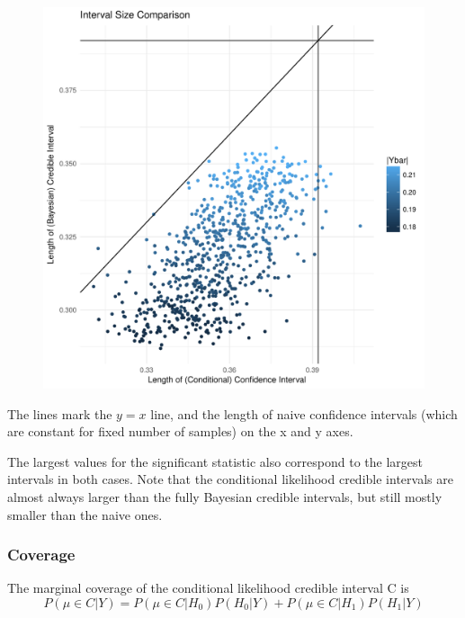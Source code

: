 \documentclass[AMA,STIX1COL]{WileyNJD-v2}\usepackage[]{graphicx}\usepackage[]{color}
\makeatletter
\def\maxwidth{ %
  \ifdim\Gin@nat@width>\linewidth
    \linewidth
  \else
    \Gin@nat@width
  \fi
}
\newenvironment{knitrout}{}{} %
\makeatother
\begin{document}
\begin{figure}
\begin{knitrout}
\color{fgcolor}
\includegraphics[width=\maxwidth]{figure/unnamed-chunk-14-1} 

\end{knitrout}
\end{figure}

The lines mark the $y = x$ line, and the length of naive confidence intervals (which are constant for fixed number of samples) on the x and y axes.

The largest values for the significant statistic also correspond to the largest intervals in both cases. Note that the conditional likelihood credible intervals are almost always larger than the fully Bayesian credible intervals, but still mostly smaller than the naive ones. 

\subsubsection{Coverage}


The marginal coverage of the conditional likelihood credible interval C is 
\begin{equation}
P(\mu \in C|Y) = P(\mu \in C|H_0) P(H_0|Y)+P(\mu \in C|H_1) P(H_1|Y)
\end{equation}
\end{document}
